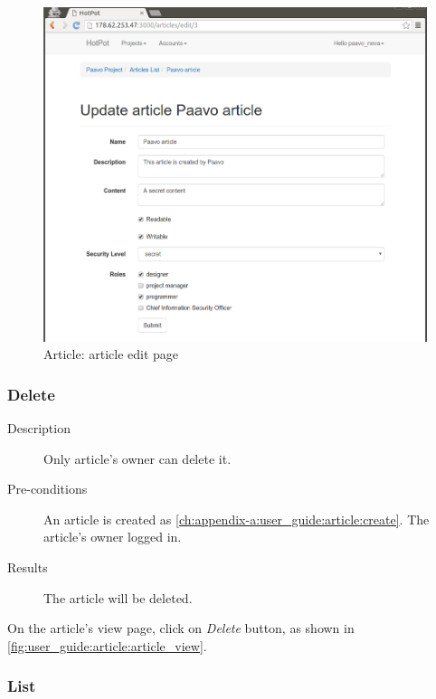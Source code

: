 \begin{figure}[bth]
\myfloatalign
\includegraphics[width=1.0\linewidth]{gfx/chapter_5/article/article_edit}
\caption[Article: article view page]{Article: article edit page}
\label{fig:user_guide:article:article_edit}
\end{figure}

\subsubsection{Delete}
\label{ch:appendix-a:user_guide:article:delete}

\begin{description}
\item[Description] Only article's owner can delete it.
\item[Pre-conditions] An article is created as \autoref{ch:appendix-a:user_guide:article:create}.
The article's owner logged in.
\item[Results] The article will be deleted.
\end{description}

On the article's view page, click on \emph{Delete} button, as shown in \autoref{fig:user_guide:article:article_view}.

\subsubsection{List}
\label{ch:appendix-a:user_guide:article:list}

